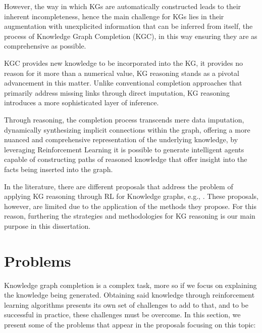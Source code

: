However, the way in which KGs are automatically constructed leads to their inherent incompleteness, hence the main challenge for KGs lies in their augmentation with unexplicited information that can be inferred from itself, the process of Knowledge Graph Completion (KGC), in this way ensuring they are as comprehensive as possible.

KGC provides new knowledge to be incorporated into the KG, it provides no reason for it more than a numerical value, KG reasoning stands as a pivotal advancement in this matter. Unlike conventional completion approaches that primarily address missing links through direct imputation, KG reasoning introduces a more sophisticated layer of inference.

Through reasoning, the completion process transcends mere data imputation, dynamically synthesizing implicit connections within the graph, offering a more nuanced and comprehensive representation of the underlying knowledge, by leveraging Reinforcement Learning it is possible to generate intelligent agents capable of constructing paths of reasoned knowledge that offer insight into the facts being inserted into the graph.

In the literature, there are different proposals that address the problem of applying KG reasoning through RL for Knowledge graphs, e.g., \cite{}. These proposals, however, are limited due to the application of the methods they propose. For this reason, furthering the strategies and methodologies for KG reasoning is our main purpose in this dissertation.

\section{Problems}\label{sec:moti-problems}
Knowledge graph completion is a complex task, more so if we focus on explaining the knowledge being generated. Obtaining said knowledge through reinforcement learning algorithms presents its own set of challenges to add to that, and to be successful in practice, these challenges must be overcome. In this section, we present some of the problems that appear in the proposals focusing on this topic:

